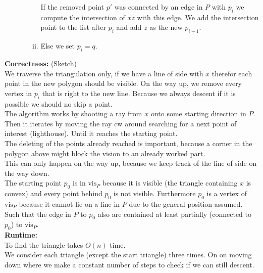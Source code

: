 \documentclass[11pt,a4paper,ngerman]{article}
\begin{document}
\begin{enumerate}[1.]
\begin{enumerate}[a.]
\begin{enumerate}[(i)]
                            If the removed point $p'$ was connected by an edge
                            in $P$ with $p_i$ we compute the intersection of
                            $\overline{xz}$ with this edge. We add the intersection
                            point to the list after $p_i$ and add $z$ as the new $p_{i+1}$.
                        \item Else we set $p_i = q$.
                    \end{enumerate} 
        \end{enumerate}
\end{enumerate}

\textbf{Correctness:} (Sketch)\\

We traverse the triangulation only, if we have a line of side with $x$
therefor each point in the new polygon should be visible. On
the way up, we remove every vertex in $p_i$ that is right
to the new line. Because we always
descent if it is possible we should no skip a point.\\

The algorithm works by shooting a ray from $x$ onto some starting direction in $P$. Then it iterates by moving the ray cw around searching for a next point of interest (lighthouse). Until it reaches the starting point.\\

The deleting of the points already reached is important, because a corner
in the polygon above might block the vision to an already worked part.\\
This can only happen on the way up, because we keep track of the line of side
on the way down.\\

The starting point $p_0$ is in $\text{vis}_P$ because it is visible (the
triangle containing $x$ is convex) and every point behind $p_0$ is not visible.
Furthermore $p_0$ is a vertex of $\text{vis}_P$ because it cannot lie on a
line in $P$ due to the general position assumed. Such that the edge in $P$
to $p_0$ also are contained at least partially (connected to $p_0$) to $\text{vis}_P$.\\

\textbf{Runtime:}\\

To find the triangle takes $O(n)$ time.\\
We consider each triangle (except the start triangle) three times.
On on moving down where we make a constant number of steps to check
if we can still descent.
\end{document}
